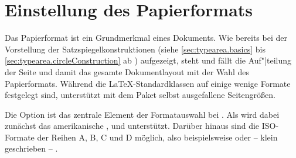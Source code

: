 \iffalse%
\iftrue%
Wenn Sie konkrete Vorgaben bezüglich der Ränder zu erfüllen haben, ist
\Package{typearea} nicht geeignet. In diesem Fall ist die Verwendung des
Pakets \Package{geometry}\IndexPackage{geometry}\important{\Package{geometry}}
(siehe \cite{package:geometry}) empfehlenswert.%
\else%
Das Paket \Package{typearea} ist nicht dafür gedacht, bestimmte Randbreiten
einzustellen. Dafür ist das Paket \Package{geometry}\IndexPackage{geometry}
(siehe \cite{package:geometry}) empfehlenswert.%
\fi%
\fi


\section{Einstellung des Papierformats}%
%
\BeginIndexGroup

Das Papierformat ist ein \iffalse entscheidendes \fi%
Grundmerkmal eines Dokuments. Wie
bereits bei der Vorstellung der \iffalse unterstützten \fi%
Satzspiegelkonstruktionen (siehe
\autoref{sec:typearea.basics} bis \autoref{sec:typearea.circleConstruction} ab
)
aufgezeigt, steht und fällt die Auf"|teilung der Seite und damit das gesamte
Dokumentlayout mit der Wahl des Papierformats. Während die
\LaTeX-Standardklassen auf einige wenige Formate festgelegt sind, unterstützt
\KOMAScript{} mit dem Paket  selbst ausgefallene
Seitengrößen.


\begin{Declaration}
\end{Declaration}%
Die Option  ist das
zentrale Element der Formatauswahl %
bei \KOMAScript. Als  wird dabei zunächst das amerikanische
,  und  unterstützt. Darüber
hinaus sind die ISO-Formate der Reihen A, B, C und D möglich, also
beispielsweise  oder -- klein geschrieben -- . 

